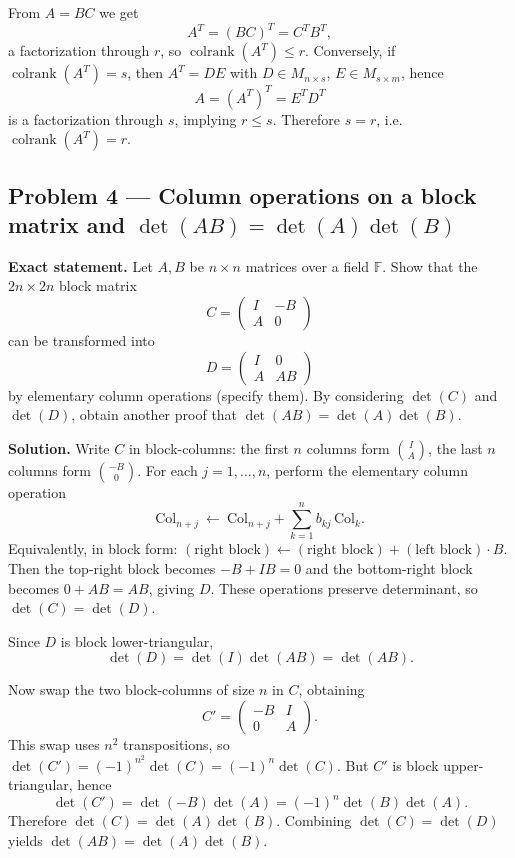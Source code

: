 \documentclass[12pt,a4paper]{article}
\theoremstyle{plain}
\theoremstyle{definition}      %
\begin{document}
From \(A=BC\) we get
\[
A^T=(BC)^T=C^T B^T,
\]
a factorization through \(r\), so \(\operatorname{colrank}(A^T)\le r\).
Conversely, if \(\operatorname{colrank}(A^T)=s\), then \(A^T=DE\) with \(D\in M_{n\times s}\), \(E\in M_{s\times m}\), hence
\[
A=(A^T)^T=E^T D^T
\]
is a factorization through \(s\), implying \(r\le s\).
Therefore \(s=r\), i.e. \(\operatorname{colrank}(A^T)=r\).

\subsection*{Problem 4 — Column operations on a block matrix and \(\det(AB)=\det(A)\det(B)\)}

\textbf{Exact statement.}
Let \(A,B\) be \(n\times n\) matrices over a field \(\mathbb F\).
Show that the \(2n\times 2n\) block matrix
\[
C=\begin{pmatrix}
	I & -B\\
	A & 0
\end{pmatrix}
\]
can be transformed into
\[
D=\begin{pmatrix}
	I & 0\\
	A & AB
\end{pmatrix}
\]
by elementary column operations (specify them).
By considering \(\det(C)\) and \(\det(D)\), obtain another proof that \(\det(AB)=\det(A)\det(B)\).

\textbf{Solution.}
Write \(C\) in block-columns:
the first \(n\) columns form \(\binom{I}{A}\), the last \(n\) columns form \(\binom{-B}{0}\).
For each \(j=1,\dots,n\), perform the elementary column operation
\[
\mathrm{Col}_{n+j}\ \leftarrow\ \mathrm{Col}_{n+j}+\sum_{k=1}^n b_{kj}\,\mathrm{Col}_k.
\]
Equivalently, in block form: \((\text{right block})\leftarrow(\text{right block})+(\text{left block})\cdot B\).
Then the top-right block becomes \(-B+IB=0\) and the bottom-right block becomes \(0+AB=AB\), giving \(D\).
These operations preserve determinant, so \(\det(C)=\det(D)\).

Since \(D\) is block lower-triangular,
\[
\det(D)=\det(I)\det(AB)=\det(AB).
\]

Now swap the two block-columns of size \(n\) in \(C\), obtaining
\[
C'=\begin{pmatrix}-B&I\\ 0&A\end{pmatrix}.
\]
This swap uses \(n^2\) transpositions, so \(\det(C')=(-1)^{n^2}\det(C)=(-1)^n\det(C)\).
But \(C'\) is block upper-triangular, hence
\[
\det(C')=\det(-B)\det(A)=(-1)^n\det(B)\det(A).
\]
Therefore \(\det(C)=\det(A)\det(B)\).
Combining \(\det(C)=\det(D)\) yields \(\det(AB)=\det(A)\det(B)\).
\end{document}
